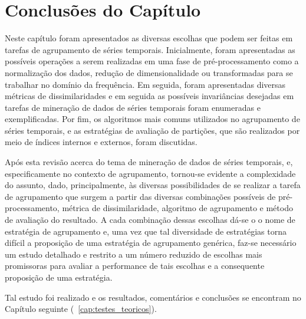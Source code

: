 


\section{Conclusões do Capítulo}

Neste capítulo foram apresentados as diversas escolhas que podem ser feitas em tarefas de agrupamento de séries temporais. Inicialmente, foram apresentadas as possíveis operações a serem realizadas em uma fase de pré-processamento como a normalização dos dados, redução de dimensionalidade ou transformadas para se trabalhar no domínio da frequência. Em seguida, foram apresentadas diversas métricas de dissimilaridades e em seguida as possíveis invariâncias desejadas em tarefas de mineração de dados de séries temporais foram enumeradas e exemplificadas. Por fim, os algoritmos mais comuns utilizados no agrupamento de séries temporais, e as estratégias de avaliação de partições, que são realizados por meio de índices internos e externos, foram discutidas.

Após esta revisão acerca do tema de mineração de dados de séries temporais, e, especificamente no contexto de agrupamento, tornou-se evidente a complexidade do assunto, dado, principalmente, às diversas possibilidades de se realizar a tarefa de agrupamento que surgem a partir das diversas combinações possíveis de pré-processamento, métrica de dissimilaridade, algoritmo de agrupamento e método de avaliação do resultado. A cada combinação dessas escolhas dá-se o o nome de estratégia de agrupamento e, uma vez que tal diversidade de estratégias torna difícil a proposição de uma estratégia de agrupamento genérica, faz-se necessário um estudo detalhado e restrito a um número reduzido de escolhas mais promissoras para avaliar a performance de tais escolhas e a consequente proposição de uma estratégia.

Tal estudo foi realizado e os resultados, comentários e conclusões se encontram no Capítulo seguinte (~\ref{cap:testes_teoricos}).
